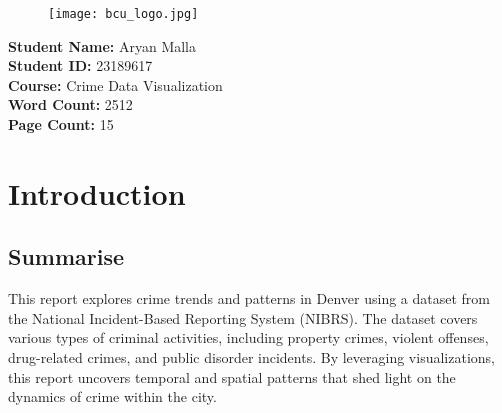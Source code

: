 \documentclass{article}
\begin{document}
\begin{figure}[H]
    \centering
    \texttt{[image: bcu\_logo.jpg]}
\end{figure}

\begin{center}
    \begin{minipage}{0.6\textwidth} %
    \begin{flushleft}
        \Large\textbf{Student Name:}\hspace{0.2cm} Aryan Malla \\
        \vspace{0.5cm}        \Large\textbf{Student ID:}\hspace{1cm} 23189617 \\
        \vspace{0.5cm}
        \Large\textbf{Course:}\hspace{1.5cm} Crime Data Visualization \\
        \vspace{0.5cm}
        \Large\textbf{Word Count:}\hspace{1cm} 2512 \\
        \vspace{0.5cm}
        \Large\textbf{Page Count:}\hspace{1.2cm} 15
    \end{flushleft}
    \end{minipage}
\end{center}


\newpage

\renewcommand{\cftsecleader}{\cftdotfill{\cftdotsep}}
\tableofcontents
\newpage

\listoffigures %
\newpage

\section{Introduction}
\label{sec:introduction}
\subsection{Summarise}
This report explores crime trends and patterns in Denver using a dataset from the National Incident-Based Reporting System (NIBRS). The dataset covers various types of criminal activities, including property crimes, violent offenses, drug-related crimes, and public disorder incidents. By leveraging visualizations, this report uncovers temporal and spatial patterns that shed light on the dynamics of crime within the city.
\end{document}
